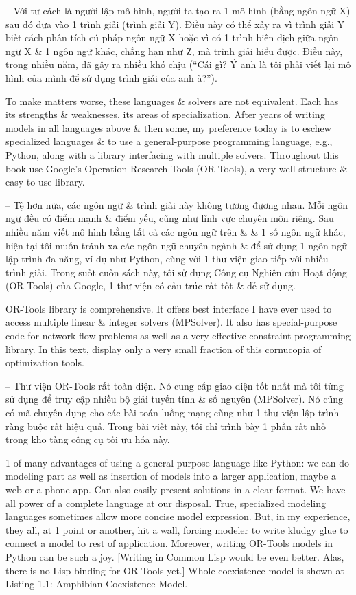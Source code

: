 \documentclass{article}
\begin{document}
\begin{itemize}
\begin{itemize}
        -- Với tư cách là người lập mô hình, người ta tạo ra 1 mô hình (bằng ngôn ngữ X) sau đó đưa vào 1 trình giải (trình giải Y). Điều này có thể xảy ra vì trình giải Y biết cách phân tích cú pháp ngôn ngữ X hoặc vì có 1 trình biên dịch giữa ngôn ngữ X \& 1 ngôn ngữ khác, chẳng hạn như Z, mà trình giải hiểu được. Điều này, trong nhiều năm, đã gây ra nhiều khó chịu (``Cái gì? Ý anh là tôi phải viết lại mô hình của mình để sử dụng trình giải của anh à?'').

        To make matters worse, these languages \& solvers are not equivalent. Each has its strengths \& weaknesses, its areas of specialization. After years of writing models in all languages above \& then some, my preference today is to eschew specialized languages \& to use a general-purpose programming language, e.g., Python, along with a library interfacing with multiple solvers. Throughout this book use Google's Operation Research Tools (OR-Tools), a very well-structure \& easy-to-use library.

        -- Tệ hơn nữa, các ngôn ngữ \& trình giải này không tương đương nhau. Mỗi ngôn ngữ đều có điểm mạnh \& điểm yếu, cũng như lĩnh vực chuyên môn riêng. Sau nhiều năm viết mô hình bằng tất cả các ngôn ngữ trên \& \& 1 số ngôn ngữ khác, hiện tại tôi muốn tránh xa các ngôn ngữ chuyên ngành \& để sử dụng 1 ngôn ngữ lập trình đa năng, ví dụ như Python, cùng với 1 thư viện giao tiếp với nhiều trình giải. Trong suốt cuốn sách này, tôi sử dụng Công cụ Nghiên cứu Hoạt động (OR-Tools) của Google, 1 thư viện có cấu trúc rất tốt \& dễ sử dụng.

        OR-Tools library is comprehensive. It offers best interface I have ever used to access multiple linear \& integer solvers (MPSolver). It also has special-purpose code for network flow problems as well as a very effective constraint programming library. In this text, display only a very small fraction of this cornucopia of optimization tools.

        -- Thư viện OR-Tools rất toàn diện. Nó cung cấp giao diện tốt nhất mà tôi từng sử dụng để truy cập nhiều bộ giải tuyến tính \& số nguyên (MPSolver). Nó cũng có mã chuyên dụng cho các bài toán luồng mạng cũng như 1 thư viện lập trình ràng buộc rất hiệu quả. Trong bài viết này, tôi chỉ trình bày 1 phần rất nhỏ trong kho tàng công cụ tối ưu hóa này.

        1 of many advantages of using a general purpose language like Python: we can do modeling part as well as insertion of models into a larger application, maybe a web or a phone app. Can also easily present solutions in a clear format. We have all power of a complete language at our disposal. True, specialized modeling languages sometimes allow more concise model expression. But, in my experience, they all, at 1 point or another, hit a wall, forcing modeler to write kludgy glue to connect a model to rest of application. Moreover, writing OR-Tools models in Python can be such a joy. [Writing in Common Lisp would be even better. Alas, there is no Lisp binding for OR-Tools yet.] Whole coexistence model is shown at {\sf Listing 1.1: Amphibian Coexistence Model}.


\end{itemize}
\end{itemize}
\end{document}
